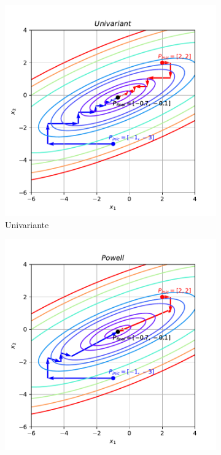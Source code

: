 \documentclass[10pt, a4paper]{article}
\begin{document}
\begin{figure}[htpb]
  \centering
  \begin{subfigure}[b]{0.32\textwidth}
      \centering
      \includegraphics[width=\textwidth]{images/q1a_Univariant.pdf}
      \caption{Univariante}
      \label{fig:q1a_univariant}
  \end{subfigure}
  \hfill
  \begin{subfigure}[b]{0.32\textwidth}
    \centering
    \includegraphics[width=\textwidth]{images/q1a_Powell.pdf}

\end{subfigure}
\end{figure}
\end{document}
